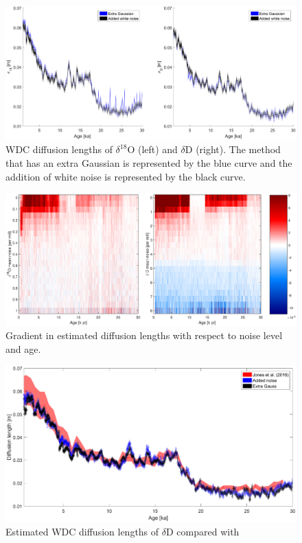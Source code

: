 \documentclass[draft, jgrga]{AGUTeX}
\begin{document}
\begin{figure}
	\includegraphics[width=.9\linewidth]{WAIS_diffusion_adding_noise.eps}
	\caption{WDC diffusion lengths of $\delta^{18}$O (left) and $\delta$D (right).
		The method that has an extra Gaussian is represented by the blue curve and
		the addition of white noise is represented by the black curve.} \label{WAIS_diffusion_adding_noise}
\end{figure}

\begin{figure}
	\includegraphics[width=.9\linewidth]{added_noise_sensitivity.eps}
	\caption{Gradient in estimated diffusion lengths with respect to noise level and age.} \label{added_noise_sensitivity}
\end{figure}

\begin{figure}
	\includegraphics[width=.9\linewidth]{WAIS_diffusion_lengths.eps}
	\caption{Estimated WDC diffusion lengths of $\delta$D compared with \cite{Jones2016}} \label{WAIS_diffusion_lengths}
\end{figure}
\end{document}
